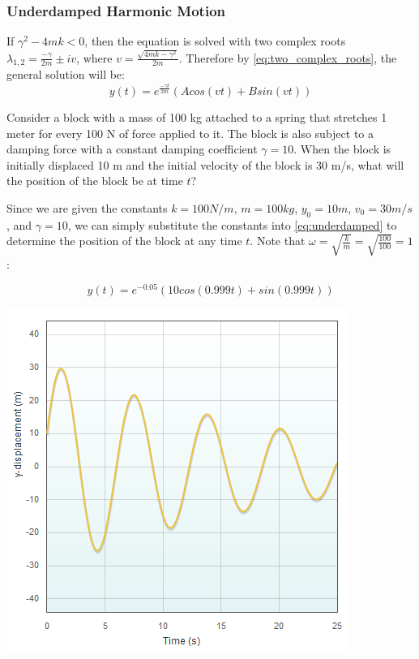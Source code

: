 \documentclass[11pt]{article} %
\newenvironment{Figure}
  {\par\medskip\noindent\minipage{\linewidth}}
  {\endminipage\par\medskip}
\begin{document}
\begin{multicols}{2}
\subsubsection {Underdamped Harmonic Motion}
If ${\gamma}^2 - 4mk < 0$, then the equation is solved with two complex roots ${\lambda}_{1,2} = \frac{-\gamma}{2m} \pm iv$, where $v = \frac{\sqrt{4mk - {\gamma}^2}}{2m}$. Therefore by \eqref{eq:two_complex_roots}, the general solution will be:
\begin{equation}\label{eq:underdamped}
y(t) = e^{{\frac{-{\gamma}t}{2m}}}(Acos(vt) + Bsin(vt))
\end{equation}

Consider a block with a mass of 100 kg attached to a spring that stretches 1 meter for every 100 N of force applied to it. The block is also subject to a damping force with a constant damping coefficient $\gamma = 10$. When the block is initially displaced 10 m and the initial velocity of the block is 30 m/s, what will the position of the block be at time $t$?

Since we are given the constants $k = 100 N/m$, $m = 100 kg$, $y_0 = 10 m$, $v_0 = 30 m/s$, and $\gamma = 10$, we can simply substitute the constants into \eqref{eq:underdamped} to determine the position of the block at any time $t$. Note that $\omega = \sqrt{\frac{k}{m}} = \sqrt{\frac{100}{100}} = 1$:

\begin{equation}
y(t) = e^{-0.05}(10cos(0.999t) + sin(0.999t))
\end{equation}

\begin{Figure}
 \centering
 \includegraphics[width=\linewidth]{underdamped_free.png}
\end{Figure}


\end{multicols}
\end{document}
